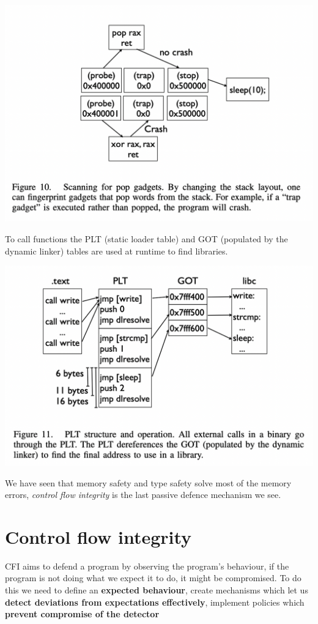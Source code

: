 \documentclass[11pt, oneside]{article}   	%
\begin{document}
\begin{enumerate}
\begin{center}
\includegraphics[scale = 0.4]{popstore}
\end{center}
\end{enumerate}
To call functions the PLT (static loader table) and GOT (populated by the dynamic linker) tables are used at runtime to find libraries.
\begin{center}
\includegraphics[scale = 0.4]{plt}
\end{center}
We have seen that memory safety and type safety solve most of the memory errors, \emph{control flow integrity} is the last passive defence mechanism we see.\\

\section*{Control flow integrity}
CFI aims to defend a program by observing the program's behaviour, if the program is not doing what we expect it to do, it might be compromised. To do this we need to define an \textbf{expected behaviour}, create mechanisms which let us \textbf{detect deviations from expectations effectively}, implement policies which \textbf{prevent compromise of the detector}
\end{document}
